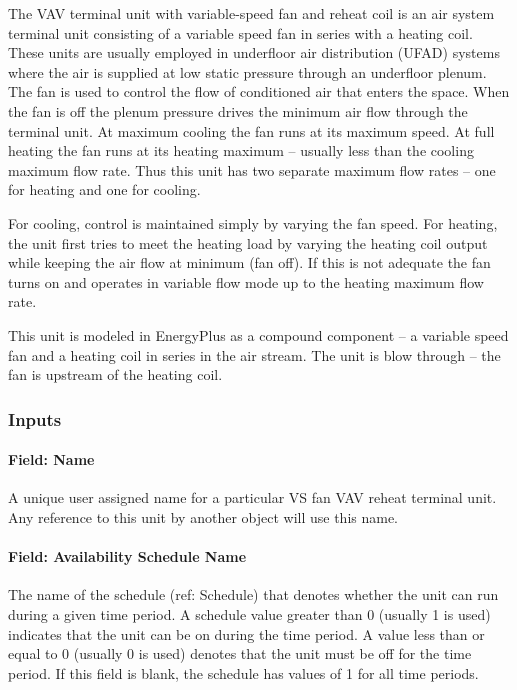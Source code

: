 The VAV terminal unit with variable-speed fan and reheat coil is an air system terminal unit consisting of a variable speed fan in series with a heating coil. These units are usually employed in underfloor air distribution (UFAD) systems where the air is supplied at low static pressure through an underfloor plenum. The fan is used to control the flow of conditioned air that enters the space. When the fan is off the plenum pressure drives the minimum air flow through the terminal unit. At maximum cooling the fan runs at its maximum speed. At full heating the fan runs at its heating maximum -- usually less than the cooling maximum flow rate. Thus this unit has two separate maximum flow rates -- one for heating and one for cooling.

For cooling, control is maintained simply by varying the fan speed. For heating, the unit first tries to meet the heating load by varying the heating coil output while keeping the air flow at minimum (fan off). If this is not adequate the fan turns on and operates in variable flow mode up to the heating maximum flow rate.

This unit is modeled in EnergyPlus as a compound component -- a variable speed fan and a heating coil in series in the air stream. The unit is blow through -- the fan is upstream of the heating coil.

\subsubsection{Inputs}\label{inputs-3-000}

\paragraph{Field: Name}\label{field-name-3-000}

A unique user assigned name for a particular VS fan VAV reheat terminal unit. Any reference to this unit by another object will use this name.

\paragraph{Field: Availability Schedule Name}\label{field-availability-schedule-name-3}

The name of the schedule (ref: Schedule) that denotes whether the unit can run during a given time period. A schedule value greater than 0 (usually 1 is used) indicates that the unit can be on during the time period. A value less than or equal to 0 (usually 0 is used) denotes that the unit must be off for the time period. If this field is blank, the schedule has values of 1 for all time periods.

